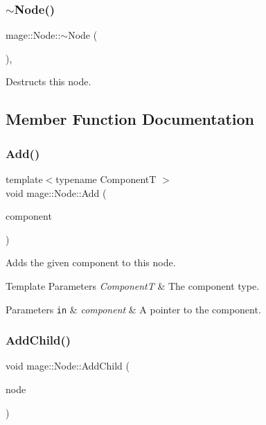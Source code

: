 \subsubsection{\texorpdfstring{$\sim$\+Node()}{~Node()}}
{\footnotesize\ttfamily mage\+::\+Node\+::$\sim$\+Node (\begin{DoxyParamCaption}{ }\end{DoxyParamCaption})\hspace{0.3cm}{\ttfamily [virtual]}, {\ttfamily [default]}}

Destructs this node. 

\subsection{Member Function Documentation}
\hypertarget{classmage_1_1_node_a58452a6195ebea7a1a7a26f9a4dd8102}{}\label{classmage_1_1_node_a58452a6195ebea7a1a7a26f9a4dd8102} 
\subsubsection{\texorpdfstring{Add()}{Add()}}
{\footnotesize\ttfamily template$<$typename ComponentT $>$ \\
void mage\+::\+Node\+::\+Add (\begin{DoxyParamCaption}\item[{\hyperlink{classmage_1_1_proxy_ptr}{Proxy\+Ptr}$<$ ComponentT $>$}]{component }\end{DoxyParamCaption})}

Adds the given component to this node.


\begin{DoxyTemplParams}{Template Parameters}
{\em ComponentT} & The component type. \\
\hline
\end{DoxyTemplParams}

\begin{DoxyParams}[1]{Parameters}
\mbox{\tt in}  & {\em component} & A pointer to the component. \\
\hline
\end{DoxyParams}
\hypertarget{classmage_1_1_node_ad2324a1a111548e4b80b8e4cbaba5221}{}\label{classmage_1_1_node_ad2324a1a111548e4b80b8e4cbaba5221} 
\subsubsection{\texorpdfstring{Add\+Child()}{AddChild()}}
{\footnotesize\ttfamily void mage\+::\+Node\+::\+Add\+Child (\begin{DoxyParamCaption}\item[{\hyperlink{classmage_1_1_node_ac575dc006e0ae1134277ade977dc06b6}{Node\+Ptr}}]{node }\end{DoxyParamCaption})}


